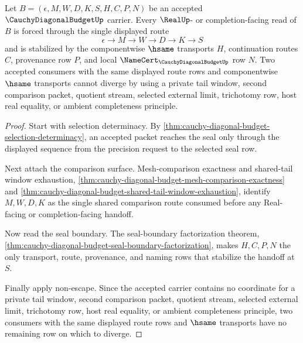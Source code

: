 \begin{theorem}
\label{thm:cauchy-diagonal-budget-route-determinacy}
Let $B=(\epsilon,M,W,D,K,S,H,C,P,N)$ be an accepted $\CauchyDiagonalBudgetUp$ carrier. Every $\RealUp$- or completion-facing read of $B$ is forced through the single displayed route
$$
\epsilon \to M \to W \to D \to K \to S
$$
and is stabilized by the componentwise $\hsame$ transports $H$, continuation routes $C$, provenance row $P$, and local $\NameCert_{\CauchyDiagonalBudgetUp}$ row $N$. Two accepted consumers with the same displayed route rows and componentwise $\hsame$ transports cannot diverge by using a private tail window, second comparison packet, quotient stream, selected external limit, trichotomy row, host real equality, or ambient completeness principle.
\end{theorem}
\begin{proof}
Start with selection determinacy. By \autoref{thm:cauchy-diagonal-budget-selection-determinacy}, an accepted packet reaches the seal only through the displayed sequence from the precision request to the selected seal row.

Next attach the comparison surface. Mesh-comparison exactness and shared-tail window exhaustion, \autoref{thm:cauchy-diagonal-budget-mesh-comparison-exactness} and \autoref{thm:cauchy-diagonal-budget-shared-tail-window-exhaustion}, identify $M,W,D,K$ as the single shared comparison route consumed before any Real-facing or completion-facing handoff.

Now read the seal boundary. The seal-boundary factorization theorem, \autoref{thm:cauchy-diagonal-budget-seal-boundary-factorization}, makes $H,C,P,N$ the only transport, route, provenance, and naming rows that stabilize the handoff at $S$.

Finally apply non-escape. Since the accepted carrier contains no coordinate for a private tail window, second comparison packet, quotient stream, selected external limit, trichotomy row, host real equality, or ambient completeness principle, two consumers with the same displayed route rows and $\hsame$ transports have no remaining row on which to diverge.
\end{proof}

